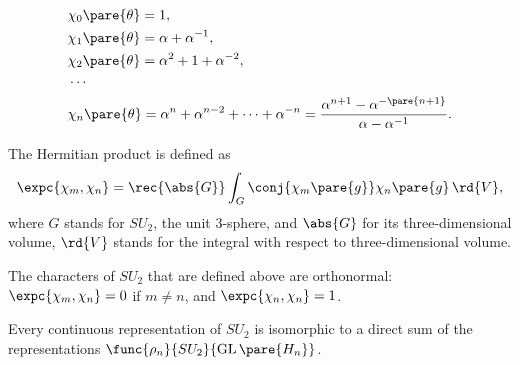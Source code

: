 \documentclass[hidelinks]{article}
\DeclareMathOperator{\GL}{GL}
\begin{document}
\begin{align*}
    & \chi_0\pare{\theta} = 1, \\
    & \chi_1\pare{\theta} = \alpha + \alpha^{-1}, \\
    & \chi_2\pare{\theta} = \alpha^2 + 1 + \alpha^{-2}, \\
    & \cdots \\
    & \chi_n\pare{\theta} = \alpha^n + \alpha^{n-2} + \cdots + \alpha^{-n} = \frac{\alpha^{n+1} - \alpha^{-\pare{n+1}}}{\alpha - \alpha^{-1}}.
\end{align*}
\par
The Hermitian product is defined as
\[ \expc{\chi_m,\chi_n} = \rec{\abs{G}}\int_G \conj{\chi_m\pare{g}}\chi_n\pare{g}\,\rd{V}, \]
where $G$ stands for $SU_2$, the unit $3$-sphere, and $\abs{G}$ for its three-dimensional volume, $\rd{V}$ stands for the integral with respect to three-dimensional volume.
\begin{theorem}
    The characters of $SU_2$ that are defined above are orthonormal: $\expc{\chi_m,\chi_n} = 0$ if $m\neq n$, and $\expc{\chi_n,\chi_n} = 1$.
\end{theorem}
\begin{theorem}
    Every continuous representation of $SU_2$ is isomorphic to a direct sum of the representations $\func{\rho_n}{SU_2}{\GL\pare{H_n}}$.
\end{theorem}


\end{document}
